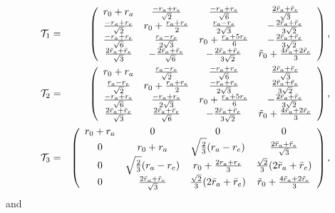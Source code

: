 \documentclass[aps,preprint,floats,epsf,epsfig,nofootinbib,letter]{revtex4}
\begin{document}
\begin{eqnarray}
 {\cal T}_1 &=& \left(
\begin{array}{cccc}
r_0+r_a
      &\frac{-r_a+r_e}{\sqrt2}
      &\frac{-r_a+r_e}{\sqrt6}
      &\frac{2\bar r_a+\bar r_e}{\sqrt3}
      \\
\frac{-r_a+r_e}{\sqrt2}
      &r_0+\frac{r_a+r_e}{2}
      &\frac{r_a-r_e}{2\sqrt3}
      &-\frac{2\bar r_a+\bar r_e}{3\sqrt2}
      \\
\frac{-r_a+r_e}{\sqrt6}
      &\frac{r_a-r_e}{2\sqrt3}
      &r_0+\frac{r_a+5r_e}{6}
      &-\frac{2\bar r_a+\bar r_e}{3\sqrt2}
      \\
\frac{2\bar r_a+\bar r_e}{\sqrt3}
      &-\frac{2\bar r_a+\bar r_e}{\sqrt6}
      &-\frac{2\bar r_a+\bar r_e}{3\sqrt2}
      &\tilde r_0+\frac{4\tilde r_a+2\tilde r_e}{3}
\end{array}
\right), \nonumber\\
%
%
 {\cal T}_2 &=& \left(
\begin{array}{cccc}
r_0+r_a
      &\frac{r_a-r_e}{\sqrt2}
      &\frac{-r_a+r_e}{\sqrt6}
      &\frac{2\bar r_a+\bar r_e}{\sqrt3}
      \\
\frac{r_a-r_e}{\sqrt2}
      &r_0+\frac{r_a+r_e}{2}
      &\frac{-r_a+r_e}{2\sqrt3}
      &\frac{2\bar r_a+\bar r_e}{3\sqrt2}
      \\
\frac{-r_a+r_e}{\sqrt6}
      &\frac{-r_a+r_e}{2\sqrt3}
      &r_0+\frac{r_a+5r_e}{6}
      &-\frac{2\bar r_a+\bar r_e}{3\sqrt2}
      \\
\frac{2\bar r_a+\bar r_e}{\sqrt3}
      &\frac{2\bar r_a+\bar r_e}{\sqrt6}
      &-\frac{2\bar r_a+\bar r_e}{3\sqrt2}
      &\tilde r_0+\frac{4\tilde r_a+2\tilde r_e}{3}
\end{array}
\right), \nonumber\\
%
%
 {\cal T}_3 &=& \left(
\begin{array}{cccc}
r_0+r_a
      &0
      &0
      &0
      \\
0
      &r_0+r_a
      &\sqrt{\frac{2}{3}}(r_a-r_e)
      &\frac{2\bar r_a+\bar r_e}{\sqrt3}
      \\
0
      &\sqrt{\frac{2}{3}}(r_a-r_e)
      &r_0+\frac{2r_a+r_e}{3}
      &\frac{\sqrt2}{3}(2\bar r_a+\bar r_e)
      \\
0
      &\frac{2\bar r_a+\bar r_e}{\sqrt3}
      &\frac{\sqrt2}{3}(2\bar r_a+\bar r_e)
      &\tilde r_0+\frac{4\tilde r_a+2\tilde r_e}{3}
\end{array}
\right),
 \label{eq:T123}
\end{eqnarray}
and
\end{document}
